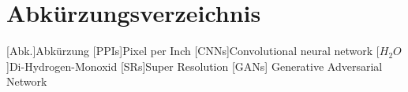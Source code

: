
\chapter*{Abkürzungsverzeichnis}

\begin{acronym}[DHBW]
    [Abk.]{Abkürzung}
    [PPIs]{Pixel per Inch}
    [CNNs]{Convolutional neural network}
    [\ensuremath{H_2O}]{Di-Hydrogen-Monoxid}
    [SRs]{Super Resolution}
    [GANs] {Generative Adversarial Network}
\end{acronym}